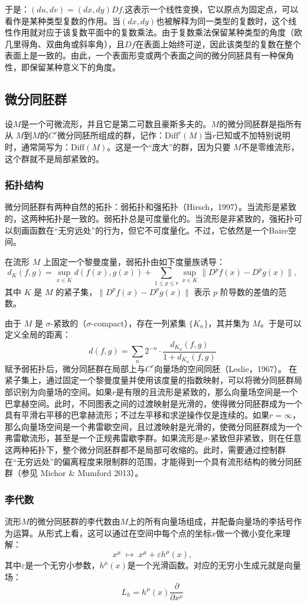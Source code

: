 于是：$(du, dv) = (dx, dy) Df$,这表示一个线性变换，它以原点为固定点，可以看作是某种类型复数的作用。当$(dx, dy)$也被解释为同一类型的复数时，这个线性作用就对应于该复数平面中的复数乘法。由于复数乘法保留某种类型的角度（欧几里得角、双曲角或斜率角），且$Df$在表面上始终可逆，因此该类型的复数在整个表面上是一致的。由此，一个表面形变或两个表面之间的微分同胚具有一种保角性，即保留某种意义下的角度。
\subsection{微分同胚群}
设$M$是一个可微流形，并且它是第二可数且豪斯多夫的。$M$的微分同胚群是指所有从 $M$到$M$的$C^r$微分同胚所组成的群，记作：$\text{Diff}^r(M)$当$r$已知或不加特别说明时，通常简写为：$\text{Diff}(M)$。这是一个“庞大”的群，因为只要 $M$不是零维流形，这个群就不是局部紧致的。
\subsubsection{拓扑结构}
微分同胚群有两种自然的拓扑：弱拓扑和强拓扑（Hirsch，1997）。当流形是紧致的，这两种拓扑是一致的。弱拓扑总是可度量化的。当流形是非紧致的，强拓扑可以刻画函数在“无穷远处”的行为，但它不可度量化。不过，它依然是一个Baire空间。

在流形 $M$ 上固定一个黎曼度量，弱拓扑由如下度量族诱导：
$$
d_K(f,g) = \sup_{x \in K} d(f(x), g(x)) + 
\sum_{1 \le p \le r} \sup_{x \in K} \|D^p f(x) - D^p g(x)\|,~
$$
其中 $K$ 是 $M$ 的紧子集，$\|D^p f(x) - D^p g(x)\|$ 表示 $p$ 阶导数的差值的范数。

由于 $M$ 是 $\sigma$-紧致的（$\sigma$-compact），存在一列紧集 $\{K_n\}$，其并集为 $M$。于是可以定义全局的距离：
$$
d(f,g) = \sum_n 2^{-n} \cdot 
\frac{d_{K_n}(f,g)}{1 + d_{K_n}(f,g)}~
$$
赋予弱拓扑后，微分同胚群在局部上与$C^r$向量场的空间同胚（Leslie，1967）。
在紧子集上，通过固定一个黎曼度量并使用该度量的指数映射，可以将微分同胚群局部识别为向量场的空间。如果$r$是有限的且流形是紧致的，那么向量场空间是一个巴拿赫空间。此时，不同图表之间的过渡映射是光滑的，使得微分同胚群成为一个具有平滑右平移的巴拿赫流形；不过左平移和求逆操作仅是连续的。如果$r = \infty$，那么向量场空间是一个弗雷歇空间，且过渡映射是光滑的，使微分同胚群成为一个弗雷歇流形，甚至是一个正规弗雷歇李群。如果流形是$\sigma$-紧致但非紧致，则在任意这两种拓扑下，整个微分同胚群都不是局部可收缩的。此时，需要通过控制群在“无穷远处”的偏离程度来限制群的范围，才能得到一个具有流形结构的微分同胚群（参见 Michor & Mumford 2013）。
\subsubsection{李代数}
流形$M$的微分同胚群的李代数由$M$上的所有向量场组成，并配备向量场的李括号作为运算。从形式上看，这可以通过在空间中每个点的坐标$x$做一个微小变化来理解：
$$
x^\mu \;\mapsto\; x^\mu + \varepsilon h^\mu(x),~
$$
其中$\varepsilon$是一个无穷小参数，$h^\mu(x)$是一个光滑函数。对应的无穷小生成元就是向量场：
$$
L_h = h^\mu(x) \frac{\partial}{\partial x^\mu}~
$$
